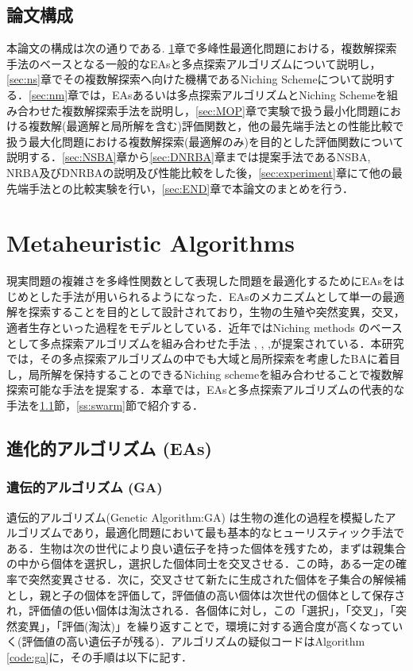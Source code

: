 \documentclass[a4j,11pt]{jarticle}
\begin{document}
\subsection{論文構成}
本論文の構成は次の通りである.
\ref{sec:MA}章で多峰性最適化問題における，複数解探索手法のベースとなる一般的なEAsと多点探索アルゴリズムについて説明し，\ref{sec:ns}章でその複数解探索へ向けた機構であるNiching Schemeについて説明する．\ref{sec:nm}章では，EAsあるいは多点探索アルゴリズムとNiching Schemeを組み合わせた複数解探索手法を説明し，\ref{sec:MOP}章で実験で扱う最小化問題における複数解(最適解と局所解を含む)評価関数と，他の最先端手法との性能比較で扱う最大化問題における複数解探索(最適解のみ)を目的とした評価関数について説明する．\ref{sec:NSBA}章から\ref{sec:DNRBA}章までは提案手法であるNSBA, NRBA及びDNRBAの説明及び性能比較をした後，\ref{sec:experiment}章にて他の最先端手法との比較実験を行い，\ref{sec:END}章で本論文のまとめを行う．

\newpage
\section{Metaheuristic Algorithms}

\label{sec:MA}

現実問題の複雑さを多峰性関数として表現した問題を最適化するためにEAsをはじめとした手法が用いられるようになった．EAsのメカニズムとして単一の最適解を探索することを目的として設計されており，生物の生殖や突然変異，交叉，適者生存といった過程をモデルとしている．近年ではNiching methods のベースとして多点探索アルゴリズムを組み合わせた手法 \cite{dADE}, \cite{nea}, \cite{CDE},が提案されている．本研究では，その多点探索アルゴリズムの中でも大域と局所探索を考慮したBAに着目し，局所解を保持することのできるNiching schemeを組み合わせることで複数解探索可能な手法を提案する．本章では，EAsと多点探索アルゴリズムの代表的な手法を\ref{ss:EAs}節，\ref{ss:swarm}節で紹介する．

\subsection{進化的アルゴリズム (EAs)}
\label{ss:EAs}

\subsubsection{遺伝的アルゴリズム (GA)}
\label{sss:GA}
遺伝的アルゴリズム(Genetic Algorithm:GA) \cite{GA} は生物の進化の過程を模擬したアルゴリズムであり，最適化問題において最も基本的なヒューリスティック手法である．生物は次の世代により良い遺伝子を持った個体を残すため，まずは親集合の中から個体を選択し，選択した個体同士を交叉させる．この時，ある一定の確率で突然変異させる．次に，交叉させて新たに生成された個体を子集合の解候補とし，親と子の個体を評価して，評価値の高い個体は次世代の個体として保存され，評価値の低い個体は淘汰される．各個体に対し，この「選択」，「交叉」，「突然変異」，「評価(淘汰)」を繰り返すことで，環境に対する適合度が高くなっていく(評価値の高い遺伝子が残る)．アルゴリズムの疑似コードはAlgorithm \ref{code:ga}に，その手順は以下に記す．
\end{document}
